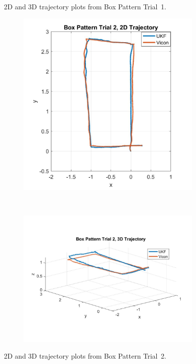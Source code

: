 \begin{figure}
\begin{subfigure}{0.6\textwidth}
    \end{subfigure}
    \caption[Box Pattern Trial 1 Trajectory]{2D and 3D trajectory plots from Box Pattern Trial~1.}
    \label{box1_traj}
\end{figure}

\begin{figure}
    \centering
    \begin{subfigure}{0.4\textwidth}
        \includegraphics[width=\textwidth,left]{box2_2d}
    \end{subfigure}%
    ~ 
    \begin{subfigure}{0.6\textwidth}
        \centering
        \includegraphics[width=\textwidth,right]{box2_3d}
    \end{subfigure}
    \caption[Box Pattern Trial 2 Trajectory]{2D and 3D trajectory plots from Box Pattern Trial~2.}
    \label{box2_traj}
\end{figure}

